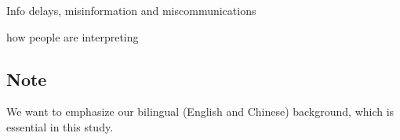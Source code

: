 
Info delays, misinformation and miscommunications


how people are interpreting 


\subsection{Note}
We want to emphasize our bilingual (English and Chinese) background, which is essential in this study.



